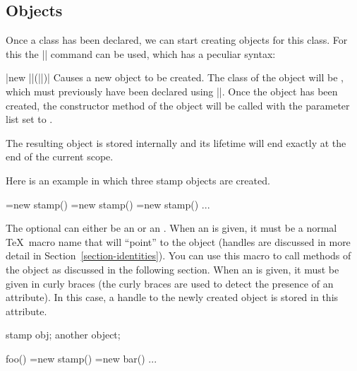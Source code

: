 \subsection{Objects}

Once a class has been declared, we can start creating objects for this class.
For this the |\pgfoonew| command can be used, which has a peculiar syntax:

\begin{command}{\pgfoonew{}|new ||(||)|}
    Causes a new object to be created. The class of the object will be
    , which must previously have been declared using
    |\pgfooclass|. Once the object has been created, the constructor method of
    the object will be called with the parameter list set to .

    The resulting object is stored internally and its lifetime will end exactly
    at the end of the current scope.

    Here is an example in which three stamp objects are created.
\begin{codeexample}
\pgfoonew \firststamp=new stamp()
\pgfoonew \secondstamp=new stamp()
{
  \pgfoonew \thirdstamp=new stamp()
  ...
}
\end{codeexample}

    The optional  can either be an
     or an . When an 
    is given, it must be a normal \TeX\ macro name that will ``point'' to the
    object (handles are discussed in more detail in
    Section~\ref{section-identities}). You can use this macro to call methods
    of the object as discussed in the following section. When an
     is given, it must be given in curly braces (the curly
    braces are used to detect the presence of an attribute). In this case, a
    handle to the newly created object is stored in this attribute.
\begin{codeexample}
{
  \attribute stamp obj;
  \attribute another object;

  \method foo() {
    =new stamp()
    =new bar()
  }
  ...
}
\end{codeexample}
\end{command}

